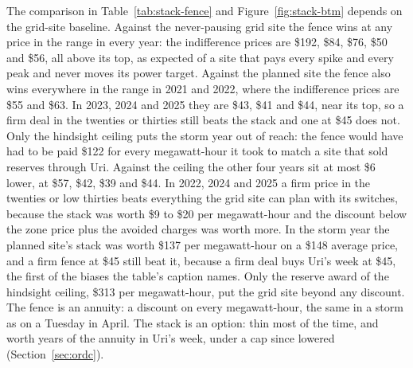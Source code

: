 The comparison in Table~\ref{tab:stack-fence} and Figure~\ref{fig:stack-btm} depends on the grid-site baseline. Against the never-pausing grid site the fence wins at any price in the range in every year: the indifference prices are \$192, \$84, \$76, \$50 and \$56, all above its top, as expected of a site that pays every spike and every peak and never moves its power target. Against the planned site the fence also wins everywhere in the range in 2021 and 2022, where the indifference prices are \$55 and \$63. In 2023, 2024 and 2025 they are \$43, \$41 and \$44, near its top, so a firm deal in the twenties or thirties still beats the stack and one at \$45 does not. Only the hindsight ceiling puts the storm year out of reach: the fence would have had to be paid \$122 for every megawatt-hour it took to match a site that sold reserves through Uri. Against the ceiling the other four years sit at most \$6 lower, at \$57, \$42, \$39 and \$44. %
In 2022, 2024 and 2025 a firm price in the twenties or low thirties beats everything the grid site can plan with its switches, because the stack was worth \$9 to \$20 per megawatt-hour and the discount below the zone price plus the avoided charges was worth more. In the storm year the planned site's stack was worth \$137 per megawatt-hour on a \$148 average price, and a firm fence at \$45 still beat it, because a firm deal buys Uri's week at \$45, the first of the biases the table's caption names. Only the reserve award of the hindsight ceiling, \$313 per megawatt-hour, put the grid site beyond any discount. %
The fence is an annuity: a discount on every megawatt-hour, the same in a storm as on a Tuesday in April. The stack is an option: thin most of the time, and worth years of the annuity in Uri's week, under a cap since lowered (Section~\ref{sec:ordc}).

